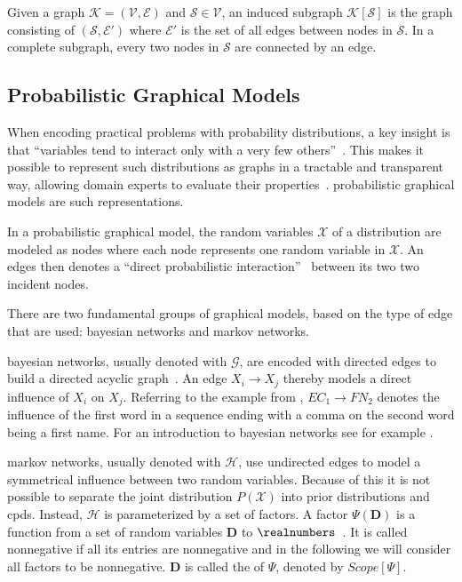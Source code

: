 Given a \gls{graph} $\mathcal{K} = (\mathcal{V},\mathcal{E})$ and $\mathcal{S}\in\mathcal{V}$, an induced \gls{subgraph} $\mathcal{K}[\mathcal{S}]$ is the \gls{graph} consisting of $(\mathcal{S},\mathcal{E'})$ where $\mathcal{E'}$ is the set of all \glspl{edge} between \glspl{node} in $\mathcal{S}$.
In a complete \gls{subgraph}, every two \glspl{node} in $\mathcal{S}$ are connected by an \gls{edge}.

\subsection{Probabilistic Graphical Models}\label{subsec:graphical-models}
When encoding practical problems with \glspl{probability distribution}, a key insight is that ``variables tend to interact only with a very few others''~\citep{koller2009probabilistic}.
This makes it possible to represent such distributions as graphs in a tractable and transparent way, allowing domain experts to evaluate their properties~\citep{koller2009probabilistic}.
\Glspl{probabilistic graphical model} are such representations.

\bigskip

In a \gls{probabilistic graphical model}, the \glspl{random variable} $\mathcal{X}$ of a distribution are modeled as \glspl{node} where each \gls{node} represents one \gls{random variable} in $\mathcal{X}$. An \glspl{edge} then denotes a ``direct probabilistic interaction''~\citep{koller2009probabilistic} between its two two incident \glspl{node}.

There are two fundamental groups of graphical models, based on the type of edge that are used: \glspl{bayesian network} and \glspl{markov network}.

\bigskip

\Glspl{bayesian network}, usually denoted with $\mathcal{G}$, are encoded with directed \glspl{edge} to build a directed acyclic graph~\citep{koller2009probabilistic}.
An \gls{edge} $X_i\to X_j$ thereby models a direct influence of $X_i$ on $X_j$.
Referring to the example from , $EC_1\to FN_2$ denotes the influence of the first word in a sequence ending with a comma on the second word being a first name.
For an introduction to \glspl{bayesian network} see for example \citet{koller2009probabilistic}.

\bigskip

\Glspl{markov network}, usually denoted with $\mathcal{H}$, use undirected \glspl{edge} to model a symmetrical influence between two \glspl{random variable}.
Because of this it is not possible to separate the \gls{joint distribution} $P(\mathcal{X})$ into \glspl{prior distribution} and \glspl{cpd}.
Instead, $\mathcal{H}$ is parameterized by a set of \glspl{factor}.
A \gls{factor} $\Psi(\mathbf{D})$ is a function from a set of \glspl{random variable} $\mathbf{D}$ to $\realnumbers$~\citep{koller2009probabilistic}.
It is called nonnegative if all its entries are nonnegative and in the following we will consider all factors to be nonnegative.
$\mathbf{D}$ is called the  of $\Psi$, denoted by $Scope[\Psi]$.

